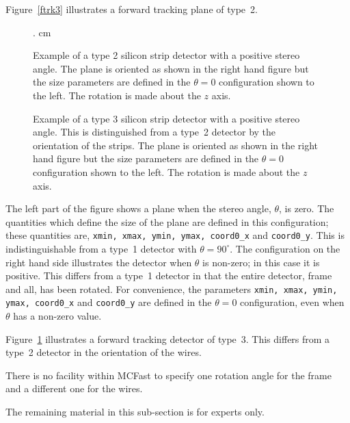 Figure~\ref{ftrk3} illustrates a forward tracking plane
of type~2.  
%
\begin{figure} [htbp]
. cm
\centerline{\epsfysize=3.0in }
\caption{\label{ftrk3} Example of a type 2 silicon strip detector with a
positive stereo angle.  The plane is oriented as shown in the right
hand figure but the size parameters are defined in the $\theta=0$ 
configuration shown to the left.  The rotation is made about the
$z$ axis.
}
\centerline{\epsfysize=3.0in }
\caption{\label{ftrk4} Example of a type 3 silicon strip detector with 
a positive stereo angle.  This is distinguished from a type~2
detector by the orientation of the strips.
The plane is oriented as shown in the right
hand figure but the size parameters are defined in the $\theta=0$ 
configuration shown to the left.  The rotation is made about the
$z$ axis.
}
\end{figure}
%
The left part of the figure shows a plane when the stereo angle,
$\theta$, is zero. The quantities which define the size of the plane
are defined in this configuration; these quantities are,
{\tt xmin, xmax, ymin, ymax, coord0\_x} and {\tt coord0\_y}.
This is indistinguishable from a type~1 detector with $\theta=90^{\circ}$.
The configuration on the right hand side illustrates the detector
when $\theta$ is non-zero; in this case it is positive.  This differs
from a type~1 detector in that the entire detector, frame and all,
has been rotated.  For convenience, the parameters
 {\tt xmin, xmax, ymin, ymax, coord0\_x} and {\tt coord0\_y} are defined
in the $\theta=0$ configuration, even when $\theta$ has
a non-zero value.

Figure~\ref{ftrk4} illustrates a forward tracking detector
of type~3. This differs from a type~2 detector in the 
orientation of the wires.

There is no facility within MCFast to specify one rotation
angle for the frame and a different one for the wires.

The remaining material in this sub-section is for experts only.


